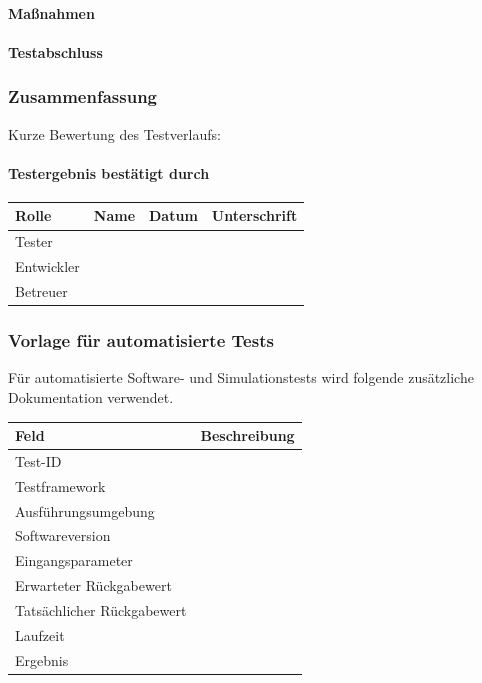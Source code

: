 \paragraph{Maßnahmen}\label{mauxdfnahmen}

\paragraph{Testabschluss}\label{testabschluss-1}

\subsubsection{Zusammenfassung}\label{zusammenfassung-4}

Kurze Bewertung des Testverlaufs:

\paragraph{Testergebnis bestätigt
durch}\label{testergebnis-bestuxe4tigt-durch}

\begin{longtable}[]{@{}llll@{}}
\toprule\noalign{}
Rolle & Name & Datum & Unterschrift \\
\midrule\noalign{}
\endhead
\bottomrule\noalign{}
\endlastfoot
Tester & & & \\
Entwickler & & & \\
Betreuer & & & \\
\end{longtable}

\subsubsection{Vorlage für automatisierte
Tests}\label{vorlage-fuxfcr-automatisierte-tests}

Für automatisierte Software- und Simulationstests wird folgende
zusätzliche Dokumentation verwendet.

\begin{longtable}[]{@{}ll@{}}
\toprule\noalign{}
Feld & Beschreibung \\
\midrule\noalign{}
\endhead
\bottomrule\noalign{}
\endlastfoot
Test-ID & \\
Testframework & \\
Ausführungsumgebung & \\
Softwareversion & \\
Eingangsparameter & \\
Erwarteter Rückgabewert & \\
Tatsächlicher Rückgabewert & \\
Laufzeit & \\
Ergebnis & \\
\end{longtable}

